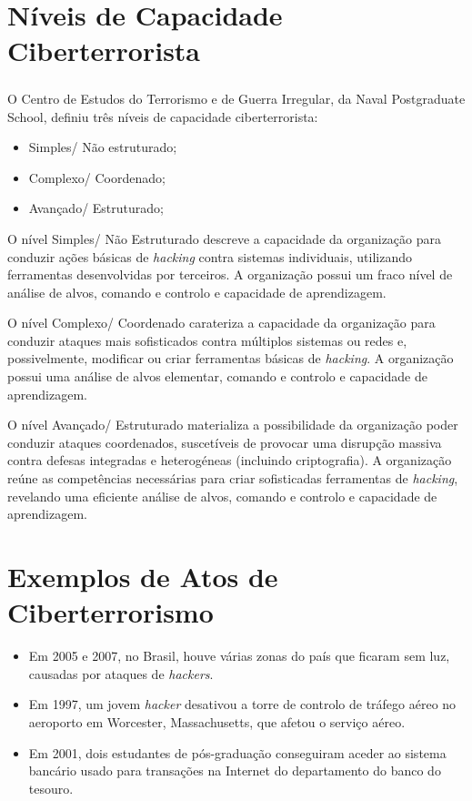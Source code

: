 \documentclass{report}
\begin{document}
\chapter{Níveis de Capacidade Ciberterrorista}
\label{chap.Níveis de Capacidade Ciberterrorista}
\paragraph{} O Centro de Estudos do Terrorismo e de Guerra Irregular, da Naval Postgraduate School, definiu três níveis de capacidade ciberterrorista:
\begin{itemize}
  \item Simples/ Não estruturado;
  \item Complexo/ Coordenado;
  \item Avançado/ Estruturado;
\end{itemize}
\par
O nível Simples/ Não Estruturado descreve a capacidade da organização para conduzir ações básicas de \textit{hacking} contra sistemas individuais, utilizando ferramentas desenvolvidas por terceiros. A organização possui um fraco nível de análise de alvos, comando e controlo e capacidade de aprendizagem.\par
O nível Complexo/ Coordenado carateriza a capacidade da organização para conduzir ataques mais sofisticados contra múltiplos sistemas ou redes e, possivelmente, modificar ou criar ferramentas básicas de \textit{hacking}. A organização possui uma análise de alvos elementar, comando e controlo e capacidade de aprendizagem.\par 
O nível Avançado/ Estruturado materializa a possibilidade da organização poder conduzir ataques coordenados, suscetíveis de provocar uma disrupção massiva contra defesas integradas e heterogéneas (incluindo criptografia). A organização reúne as competências necessárias para criar sofisticadas ferramentas de \textit{hacking}, revelando uma eficiente análise de alvos, comando e controlo e capacidade de aprendizagem.


\chapter{Exemplos de Atos de Ciberterrorismo}
\label{chap.Exemplos de Atos de Ciberterrorismo}

\begin{itemize}
   \item Em 2005 e 2007, no Brasil, houve várias zonas do país que ficaram sem luz, causadas por ataques de \textit{hackers}.
   \item Em 1997, um jovem \textit{hacker} desativou a torre de controlo de tráfego aéreo no aeroporto em Worcester, Massachusetts, que afetou o serviço aéreo.
   \item Em 2001, dois estudantes de pós-graduação conseguiram aceder ao sistema bancário usado para transações na Internet do departamento do banco do tesouro.
\end{itemize}
\end{document}

